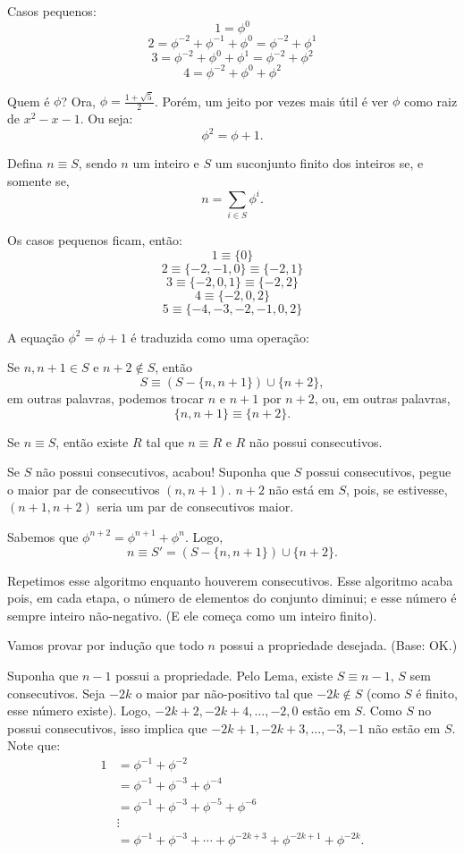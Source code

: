 	\begin{sol}
		Casos pequenos:
		\[1 = \phi^0\]
		\[2 = \phi^{-2} + \phi^{-1} + \phi^{0} = \phi^{-2} + \phi^1 \]
		\[3 = \phi^{-2} + \phi^0 + \phi^1 = \phi^{-2} + \phi^2\]
		\[4 = \phi^{-2} + \phi^0 + \phi^2\]

		Quem é $\phi$? Ora, $\phi = \frac{1 + \sqrt{5}}{2}$. Porém, um jeito por vezes mais útil é ver $\phi$ como raiz de $x^2 - x - 1$. Ou seja:
		\[\phi^2 = \phi + 1.\]

		Defina $n \equiv S$, sendo $n$ um inteiro e $S$ um suconjunto finito dos inteiros se, e somente se, \[n = \sum_{i \in S} \phi^i.\]

		Os casos pequenos ficam, então:
		\[1 \equiv \{0\}\]
		\[2 \equiv \{-2, -1, 0\} \equiv \{-2, 1\}\]
		\[3 \equiv \{-2, 0, 1\} \equiv \{-2, 2\}\]
		\[4 \equiv \{-2, 0, 2\}\]
		\[5 \equiv \{-4, -3, -2, -1, 0, 2\}\]

		A equação $\phi^2 = \phi + 1$ é traduzida como uma operação:

		Se $n, n+1 \in S$ e $n+2 \not\in S$, então \[S \equiv (S - \{ n, n+1\}) \cup \{n+2\},\]
		em outras palavras, podemos trocar $n$ e $n+1$ por $n+2$, ou, em outras palavras, \[\{n, n+1\} \equiv \{n+2\}.\]

		\begin{lem}
		Se $n \equiv S$, então existe $R$ tal que $n \equiv R$ e $R$ não possui consecutivos.
		\end{lem}
		\begin{dem} 
		Se $S$ não possui consecutivos, acabou! Suponha que $S$ possui consecutivos, pegue o maior par de consecutivos $(n, n+1)$.  $n+2$ não está em $S$, pois, se estivesse, $(n+1, n+2)$ seria um par de consecutivos maior.

		Sabemos que $\phi^{n+2} = \phi^{n+1} + \phi^n$.
		Logo, \[n \equiv S' = (S - \{n, n+1\}) \cup \{ n+2\}.\]

		Repetimos esse algoritmo enquanto houverem consecutivos. Esse algoritmo acaba pois, em cada etapa, o número de elementos do conjunto diminui; e esse número é sempre inteiro não-negativo. (E ele começa como um inteiro finito).
		\end{dem}

		Vamos provar por indução que todo $n$ possui a propriedade desejada. (Base: OK.)

		Suponha que $n - 1$ possui a propriedade. Pelo Lema, existe $S \equiv n - 1$, $S$ sem consecutivos. 
		Seja $-2k$ o maior par não-positivo tal que $-2k \not\in S$ (como $S$ é finito, esse número existe).
		Logo, $-2k+2, -2k+4, \dots, -2, 0$ estão em $S$. Como $S$ no possui consecutivos, isso implica que $-2k+1, -2k+3, \dots, -3, -1$ não estão em $S$. Note que:
		\begin{align*}
		1 &= \phi^{-1} + \phi^{-2}\\
		 &= \phi^{-1} + \phi^{-3} + \phi^{-4}\\
		 &= \phi^{-1} + \phi^{-3} + \phi^{-5} + \phi^{-6}\\
		 &\vdots\\
		 &= \phi^{-1} + \phi^{-3} + \cdots + \phi^{-2k+3} + \phi^{-2k+1} + \phi^{-2k}.
		\end{align*}


\end{sol}
